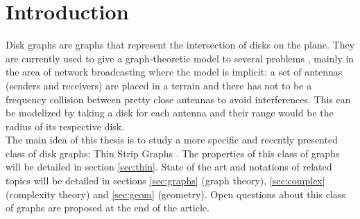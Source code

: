 \section{Introduction}

Disk graphs are graphs that represent the intersection of disks on the plane. They are
currently used to give a graph-theoretic model to several problems \cite{seiferth2016disk},
mainly in the area of network broadcasting \cite{murphey1999frequency} where the model
is implicit: a set of antennas (senders and receivers) are placed in a terrain and there
has not to be a frequency collision between pretty close antennas to avoid interferences.
This can be modelized by taking a disk for each antenna and their range would be the radius
of its respective disk.\\

The main idea of this thesis is to study a more specific and recently presented class
of disk graphs: Thin Strip Graphs \cite{hayashiThinStripGraphs2017}. The properties
of this class of graphs will be detailed in section \ref{sec:thin}. State of the art and notations
of related topics will be detailed in sections \ref{sec:graphs} (graph theory), \ref{sec:complex}
(complexity theory) and \ref{sec:geom} (geometry). Open questions about this class of graphs
are proposed at the end of the article.
